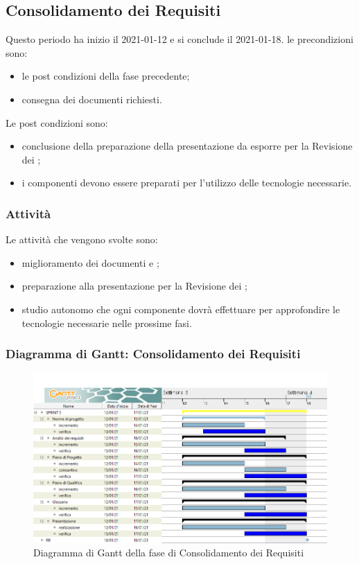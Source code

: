 \newpage
\subsection{Consolidamento dei Requisiti}
Questo periodo ha inizio il 2021-01-12 e si conclude il 2021-01-18.
le precondizioni sono:
\begin{itemize}
	\item le post condizioni della fase precedente;
	\item consegna dei documenti richiesti.
\end{itemize}
Le post condizioni sono:
\begin{itemize}
	\item conclusione della preparazione della presentazione da esporre per la Revisione dei ;
	\item i componenti devono essere preparati per l'utilizzo delle tecnologie necessarie.
\end{itemize}
\subsubsection{Attività}
Le attività che vengono svolte sono:
\begin{itemize}
	\item miglioramento dei documenti e ;
	\item preparazione alla presentazione per la Revisione dei ;
	\item studio autonomo che ogni componente dovrà effettuare per approfondire le tecnologie necessarie nelle prossime fasi.
\end{itemize}
\subsubsection{Diagramma di Gantt: Consolidamento dei Requisiti}
\begin{figure}[H]
    \centering
    \includegraphics[scale = 0.4]{components/img/consolidamento_requisiti.png}
    \caption{Diagramma di Gantt della fase di Consolidamento dei Requisiti}
    \label{fig:\glo{Diagramma di Gantt}, fase di Consolidamento dei \glo{Requisiti}}
\end{figure}

